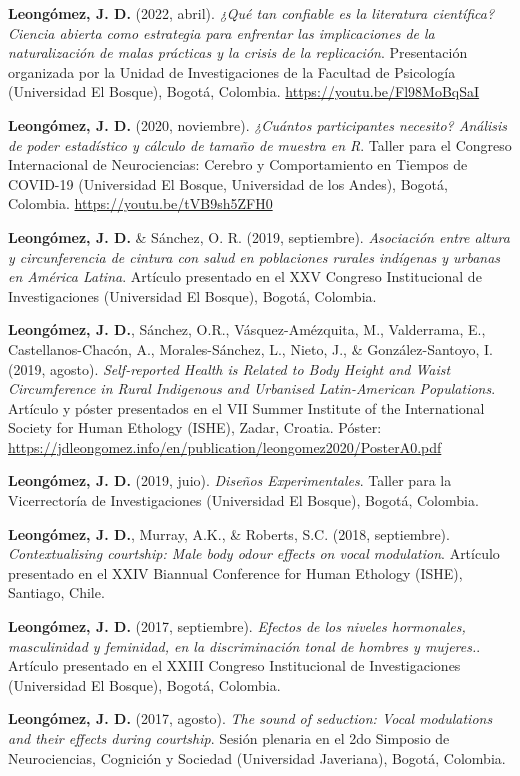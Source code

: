 \documentclass[11pt,a4paper,]{awesome-cv}
\begin{document}
\textbf{Leongómez, J. D.} (2022, abril). \emph{¿Qué tan confiable es la
literatura científica? Ciencia abierta como estrategia para enfrentar
las implicaciones de la naturalización de malas prácticas y la crisis de
la replicación}. Presentación organizada por la Unidad de
Investigaciones de la Facultad de Psicología (Universidad El Bosque),
Bogotá, Colombia. \url{https://youtu.be/Fl98MoBqSaI}

\textbf{Leongómez, J. D.} (2020, noviembre). \emph{¿Cuántos
participantes necesito? Análisis de poder estadístico y cálculo de
tamaño de muestra en R}. Taller para el Congreso Internacional de
Neurociencias: Cerebro y Comportamiento en Tiempos de COVID-19
(Universidad El Bosque, Universidad de los Andes), Bogotá, Colombia.
\url{https://youtu.be/tVB9sh5ZFH0}

\textbf{Leongómez, J. D.} \& Sánchez, O. R. (2019, septiembre).
\emph{Asociación entre altura y circunferencia de cintura con salud en
poblaciones rurales indígenas y urbanas en América Latina}. Artículo
presentado en el XXV Congreso Institucional de Investigaciones
(Universidad El Bosque), Bogotá, Colombia.

\textbf{Leongómez, J. D.}, Sánchez, O.R., Vásquez-Amézquita, M.,
Valderrama, E., Castellanos-Chacón, A., Morales-Sánchez, L., Nieto, J.,
\& González-Santoyo, I. (2019, agosto). \emph{Self-reported Health is
Related to Body Height and Waist Circumference in Rural Indigenous and
Urbanised Latin-American Populations}. Artículo y póster presentados en
el VII Summer Institute of the International Society for Human Ethology
(ISHE), Zadar, Croatia. Póster:
\url{https://jdleongomez.info/en/publication/leongomez2020/PosterA0.pdf}

\textbf{Leongómez, J. D.} (2019, juio). \emph{Diseños Experimentales}.
Taller para la Vicerrectoría de Investigaciones (Universidad El Bosque),
Bogotá, Colombia.

\textbf{Leongómez, J. D.}, Murray, A.K., \& Roberts, S.C. (2018,
septiembre). \emph{Contextualising courtship: Male body odour effects on
vocal modulation}. Artículo presentado en el XXIV Biannual Conference
for Human Ethology (ISHE), Santiago, Chile.

\textbf{Leongómez, J. D.} (2017, septiembre). \emph{Efectos de los
niveles hormonales, masculinidad y feminidad, en la discriminación tonal
de hombres y mujeres.}. Artículo presentado en el XXIII Congreso
Institucional de Investigaciones (Universidad El Bosque), Bogotá,
Colombia.

\textbf{Leongómez, J. D.} (2017, agosto). \emph{The sound of seduction:
Vocal modulations and their effects during courtship}. Sesión plenaria
en el 2do Simposio de Neurociencias, Cognición y Sociedad (Universidad
Javeriana), Bogotá, Colombia.
\end{document}
